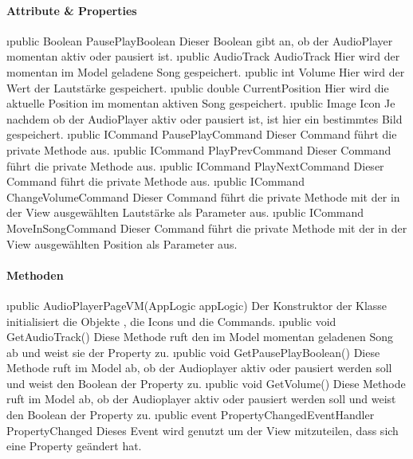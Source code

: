 \documentclass[../entwurf.tex]{subfiles}
\begin{document}
\paragraph{Attribute \& Properties}
\begin{itemize}
	\i{public Boolean PausePlayBoolean} Dieser Boolean gibt an, ob der AudioPlayer momentan aktiv oder pausiert ist.
	\i{public AudioTrack AudioTrack} Hier wird der momentan im Model geladene Song gespeichert.
	\i{public int Volume} Hier wird der Wert der Lautstärke gespeichert.
	\i{public double CurrentPosition} Hier wird die aktuelle Position im momentan aktiven Song gespeichert.
	\i{public Image Icon} Je nachdem ob der AudioPlayer aktiv oder pausiert ist, ist hier ein bestimmtes Bild gespeichert.
	\i{public ICommand PausePlayCommand} Dieser Command führt die private Methode  aus. 
	\i{public ICommand PlayPrevCommand} Dieser Command führt die private Methode  aus. 
	\i{public ICommand PlayNextCommand} Dieser Command führt die private Methode  aus. 
	\i{public ICommand ChangeVolumeCommand} Dieser Command führt die private Methode  mit der in der View ausgewählten Lautstärke als Parameter aus.
	\i{public ICommand MoveInSongCommand} Dieser Command führt die private Methode  mit der in der View ausgewählten Position als Parameter aus.
\end{itemize}
\paragraph{Methoden}
\begin{itemize}
	\i{public AudioPlayerPageVM(AppLogic appLogic)} Der Konstruktor der Klasse initialisiert die Objekte , die Icons und die Commands.
	\i{public void GetAudioTrack()} Diese Methode ruft den im Model momentan geladenen Song ab und weist sie der Property  zu.
	\i{public void GetPausePlayBoolean()} Diese Methode ruft im Model ab, ob der Audioplayer aktiv oder pausiert werden soll und weist den Boolean der Property  zu.
	\i{public void GetVolume()} Diese Methode ruft im Model ab, ob der Audioplayer aktiv oder pausiert werden soll und weist den Boolean der Property  zu.
	\i{public event PropertyChangedEventHandler PropertyChanged} Dieses Event wird genutzt um der View mitzuteilen, dass sich eine Property geändert hat.
\end{itemize}
\end{document}
